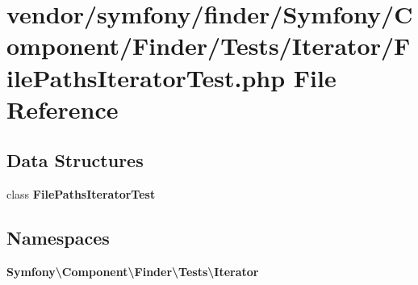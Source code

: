 \section{vendor/symfony/finder/\+Symfony/\+Component/\+Finder/\+Tests/\+Iterator/\+File\+Paths\+Iterator\+Test.php File Reference}
\label{_file_paths_iterator_test_8php}
\subsection*{Data Structures}
\begin{DoxyCompactItemize}
\item 
class {\bf File\+Paths\+Iterator\+Test}
\end{DoxyCompactItemize}
\subsection*{Namespaces}
\begin{DoxyCompactItemize}
\item 
 {\bf Symfony\textbackslash{}\+Component\textbackslash{}\+Finder\textbackslash{}\+Tests\textbackslash{}\+Iterator}
\end{DoxyCompactItemize}
